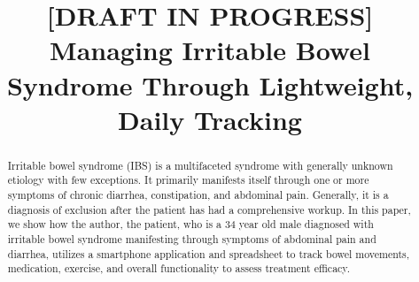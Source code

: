 \documentclass[conference]{IEEEtran}
\begin{document}
%
\title{[DRAFT IN PROGRESS] Managing Irritable Bowel Syndrome Through Lightweight, Daily Tracking}


\author{
}





\maketitle

\begin{abstract}
Irritable bowel syndrome (IBS) is a multifaceted syndrome with generally unknown etiology with few exceptions.  It primarily manifests itself through one or more symptoms of chronic diarrhea, constipation, and abdominal pain.  Generally, it is a diagnosis of exclusion after the patient has had a comprehensive workup. In this paper, we show how the author, the patient, who is a 34 year old male diagnosed with irritable bowel syndrome  manifesting through symptoms of abdominal pain and diarrhea, utilizes a smartphone application and spreadsheet to track bowel movements, medication, exercise, and overall functionality to assess treatment efficacy.
\end{abstract}




%
\IEEEpeerreviewmaketitle
\end{document}
